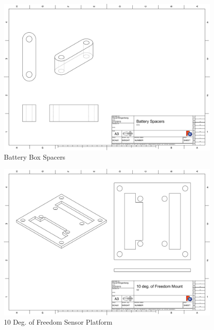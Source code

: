 \documentclass[pdftex,11pt]{article}
\begin{document}
\begin{figure}[!h]
	\centering
		\includegraphics[width=1\textwidth]{./graphics/spacers_battery-eps-converted-to.pdf}
	\caption{Battery Box Spacers}
	\label{fig:batteryspacers}
\end{figure}

\begin{figure}[!h]
	\centering
		\includegraphics[width=1\textwidth]{./graphics/10_DOF_plate-eps-converted-to.pdf}
	\caption{10 Deg. of Freedom Sensor Platform}
	\label{fig:10freedomplatform}
\end{figure}
\end{document}
